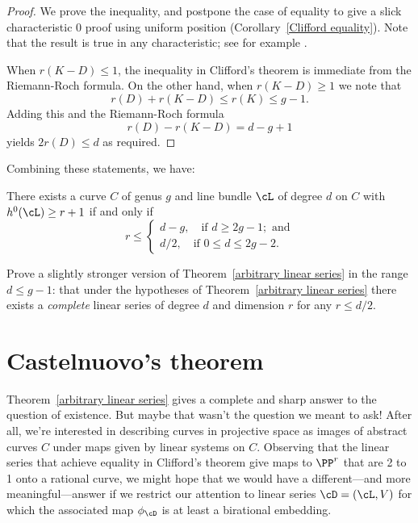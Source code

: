 \begin{proof} We prove the inequality, and  postpone the case of equality to give a slick characteristic 0 proof using  uniform position (Corollary~\ref{Clifford equality}). Note that the result is true in any characteristic; see for example \cite[Theorem ****]{Hartshorne1977}.

When $r(K-D)\leq 1$, the inequality in Clifford's theorem is immediate from the Riemann-Roch formula. On the other hand, when $r(K-D) \geq 1$ we note that
$$
 r(D)+r(K-D) \leq r(K) \leq g-1.
$$
Adding this and the Riemann-Roch formula
$$
r(D)-r(K-D) = d - g +1
$$
yields $2r(D)\leq d$ as required.
\end{proof}

Combining these statements, we have:

\begin{theorem}\label{arbitrary linear series}
There exists a curve $C$ of genus $g$ and line bundle $\cL$ of degree $d$ on $C$ with $h^0(\cL) \geq r+1$ if and only if
$$
r \leq
\begin{cases}
d-g, \quad \text{if } d \geq 2g-1; \text{ and} \\
d/2,  \quad \text{if } 0 \leq d \leq 2g-2.
\end{cases}
$$
\end{theorem}

\begin{exercise}
Prove a slightly stronger version of Theorem~\ref{arbitrary linear series} in the range $d \leq g-1$: that under the hypotheses of Theorem~\ref{arbitrary linear series} there exists a \emph{complete} linear series of degree $d$ and dimension $r$ for any $r \leq d/2$.
\end{exercise}

\section{Castelnuovo's theorem}

Theorem~\ref{arbitrary linear series} gives a complete and sharp answer to the question of existence.
%
But maybe that wasn't the question we meant to ask! After all, we're interested in describing curves in projective space as images of abstract curves $C$ under maps given by linear systems on $C$. Observing that the linear series that achieve equality in Clifford's theorem give maps to $\PP^r$ that are 2 to 1 onto a rational curve, we might hope that we would have a different---and more meaningful---answer if we  restrict our attention to linear series $\cD = (\cL,V)$ for which the associated map $\phi_\cD$ is at least a birational embedding. 

